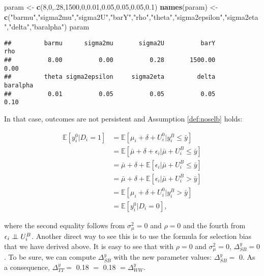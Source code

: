 \documentclass[]{book}
\newenvironment{Shaded}{\begin{snugshade}}{\end{snugshade}}
\newcommand{\KeywordTok}[1]{\textcolor[rgb]{0.13,0.29,0.53}{\textbf{#1}}}
\newcommand{\DecValTok}[1]{\textcolor[rgb]{0.00,0.00,0.81}{#1}}
\newcommand{\FloatTok}[1]{\textcolor[rgb]{0.00,0.00,0.81}{#1}}
\newcommand{\StringTok}[1]{\textcolor[rgb]{0.31,0.60,0.02}{#1}}
\newcommand{\NormalTok}[1]{#1}
\newcommand{\esp}[1]{\mathbb{E}[ #1 ]}
\newcommand\Ind{\protect\mathpalette{\protect\independenT}{\perp}}
\def\independenT#1#2{\mathrel{\setbox0\hbox{$#1#2$}\copy0\kern-\wd0\mkern4mu\box0}}
\theoremstyle{definition}
\theoremstyle{definition}
\theoremstyle{definition}
\theoremstyle{remark}
\begin{document}
\begin{Shaded}
\begin{Highlighting}[]
\NormalTok{param <-}\StringTok{ }\KeywordTok{c}\NormalTok{(}\DecValTok{8}\NormalTok{,}\DecValTok{0}\NormalTok{,.}\DecValTok{28}\NormalTok{,}\DecValTok{1500}\NormalTok{,}\DecValTok{0}\NormalTok{,}\FloatTok{0.01}\NormalTok{,}\FloatTok{0.05}\NormalTok{,}\FloatTok{0.05}\NormalTok{,}\FloatTok{0.05}\NormalTok{,}\FloatTok{0.1}\NormalTok{)}
\KeywordTok{names}\NormalTok{(param) <-}\StringTok{ }\KeywordTok{c}\NormalTok{(}\StringTok{"barmu"}\NormalTok{,}\StringTok{"sigma2mu"}\NormalTok{,}\StringTok{"sigma2U"}\NormalTok{,}\StringTok{"barY"}\NormalTok{,}\StringTok{"rho"}\NormalTok{,}\StringTok{"theta"}\NormalTok{,}\StringTok{"sigma2epsilon"}\NormalTok{,}\StringTok{"sigma2eta"}\NormalTok{,}\StringTok{"delta"}\NormalTok{,}\StringTok{"baralpha"}\NormalTok{)}
\NormalTok{param}
\end{Highlighting}
\end{Shaded}

\begin{verbatim}
##         barmu      sigma2mu       sigma2U          barY           rho 
##          8.00          0.00          0.28       1500.00          0.00 
##         theta sigma2epsilon     sigma2eta         delta      baralpha 
##          0.01          0.05          0.05          0.05          0.10
\end{verbatim}

In that case, outcomes are not persistent and Assumption
\ref{def:noselb} holds:

\begin{align*}
\esp{y_i^0|D_i=1} & = \esp{\mu_i+\delta+U_i^0|y_i^B\leq\bar{y}}\\
                  & = \esp{\bar{\mu}+\delta+\epsilon_i|\bar{\mu}+U_i^B\leq\bar{y}}\\
                  & = \bar{\mu} + \delta + \esp{\epsilon_i|\bar{\mu}+U_i^B\leq\bar{y}}\\
                  & = \bar{\mu} + \delta + \esp{\epsilon_i|\bar{\mu}+U_i^B>\bar{y}}\\
                  & = \esp{\mu_i+\delta+U_i^0|y_i^B>\bar{y}}\\
                  & = \esp{y_i^0|D_i=0},                  
\end{align*}

where the second equality follows from \(\sigma^2_{\mu}=0\) and
\(\rho=0\) and the fourth from \(\epsilon_i \Ind U_i^B\). Another direct
way to see this is to use the formula for selection bias that we have
derived above. It is easy to see that with \(\rho=0\) and
\(\sigma^2_{\mu}=0\), \(\Delta^y_{SB}=0\). To be sure, we can compute
\(\Delta^y_{SB}\) with the new parameter values: \(\Delta^y_{SB}=\) 0.
As a consequence, \(\Delta^y_{TT}=\) 0.18 \(=\) 0.18 \(=\Delta^y_{WW}\).
\end{document}
